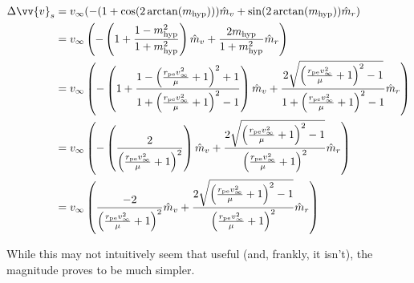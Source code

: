 \documentclass{article}
\begin{document}
\begin{align*}
    \Delta\vv{v}_s & = v_\infty(-(1+\cos(2\arctan(m_\text{hyp})))\hat{m}_v+\sin(2\arctan(m_\text{hyp}))\hat{m}_r)                                                                                                                                                                                                               \\
                   & = v_\infty\left(-\left(1+\frac{1-m_\text{hyp}^2}{1+m_\text{hyp}^2}\right)\hat{m}_v+\frac{2m_\text{hyp}}{1+m_\text{hyp}^2}\hat{m}_r\right)                                                                                                                                                                  \\
                   & = v_\infty\left(-\left(1+\frac{1-\left(\frac{r_\text{pe}v_\infty^2}{\mu}+1\right)^2+1}{1+\left(\frac{r_\text{pe}v_\infty^2}{\mu}+1\right)^2-1}\right)\hat{m}_v+\frac{2\sqrt{\left(\frac{r_\text{pe}v_\infty^2}{\mu}+1\right)^2-1}}{1+\left(\frac{r_\text{pe}v_\infty^2}{\mu}+1\right)^2-1}\hat{m}_r\right) \\
                   & = v_\infty\left(-\left(\frac{2}{\left(\frac{r_\text{pe}v_\infty^2}{\mu}+1\right)^2}\right)\hat{m}_v+\frac{2\sqrt{\left(\frac{r_\text{pe}v_\infty^2}{\mu}+1\right)^2-1}}{\left(\frac{r_\text{pe}v_\infty^2}{\mu}+1\right)^2}\hat{m}_r\right)                                                                \\
                   & = v_\infty\left(\frac{-2}{\left(\frac{r_\text{pe}v_\infty^2}{\mu}+1\right)^2}\hat{m}_v+\frac{2\sqrt{\left(\frac{r_\text{pe}v_\infty^2}{\mu}+1\right)^2-1}}{\left(\frac{r_\text{pe}v_\infty^2}{\mu}+1\right)^2}\hat{m}_r\right)                                                                             \\
\end{align*}

While this may not intuitively seem that useful (and, frankly, it isn't), the magnitude proves to be much simpler.
\end{document}
